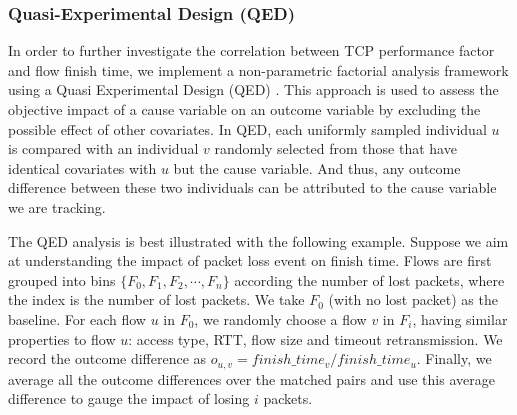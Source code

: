 \subsubsection{Quasi-Experimental Design (QED)}


In order to further investigate the correlation between TCP performance factor and flow finish time, we implement a non-parametric factorial analysis framework using a Quasi Experimental Design (QED) \cite{krishnan2013video}. This approach is used to assess the objective impact of a cause variable on an outcome variable by excluding the possible effect of other covariates. In QED, each uniformly sampled individual $u$ is compared with an individual $v$ randomly selected from those that have identical covariates with $u$ but the cause variable. And thus, any outcome difference between these two individuals can be attributed to the cause variable we are tracking. 

The QED analysis is best illustrated with the following example. Suppose we aim at understanding the impact of packet loss event on finish time. Flows are first grouped into bins $\{ F_0, F_1, F_2, \cdots, F_n \}$ according the number of lost packets, where the index is the number of lost packets. We take $F_0$ (\ie with no lost packet) as the baseline. For each flow $u$ in $F_0$, we randomly choose a flow $v$ in $F_i$, having similar properties to flow $u$: access type, RTT, flow size and timeout retransmission. We record the outcome difference as $o_{u,v} = finish\_time_{v} / finish\_time_{u}$. Finally, we average all the outcome differences over the matched pairs and use this average difference to gauge the impact of losing $i$ packets.

